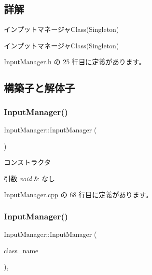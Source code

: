 \subsection{詳解}
インプットマネージャ\+Class(\+Singleton) 

インプットマネージャ\+Class(\+Singleton) 

 Input\+Manager.\+h の 25 行目に定義があります。



\subsection{構築子と解体子}
\mbox{\label{class_input_manager_a8be46886da639b26d67181c29dab6d6c}} 
\subsubsection{\texorpdfstring{Input\+Manager()}{InputManager()}\hspace{0.1cm}{\footnotesize\ttfamily [1/2]}}
{\footnotesize\ttfamily Input\+Manager\+::\+Input\+Manager (\begin{DoxyParamCaption}{ }\end{DoxyParamCaption})\hspace{0.3cm}{\ttfamily [private]}}



コンストラクタ 


\begin{DoxyParams}{引数}
{\em void} & なし \\
\hline
\end{DoxyParams}


 Input\+Manager.\+cpp の 68 行目に定義があります。

\mbox{\label{class_input_manager_ae633f27688024e06b3d780778636c002}} 
\subsubsection{\texorpdfstring{Input\+Manager()}{InputManager()}\hspace{0.1cm}{\footnotesize\ttfamily [2/2]}}
{\footnotesize\ttfamily Input\+Manager\+::\+Input\+Manager (\begin{DoxyParamCaption}\item[{const \mbox{\hyperlink{class_input_manager}{Input\+Manager}} \&}]{class\+\_\+name }\end{DoxyParamCaption})\hspace{0.3cm}{\ttfamily [private]}, {\ttfamily [delete]}}



